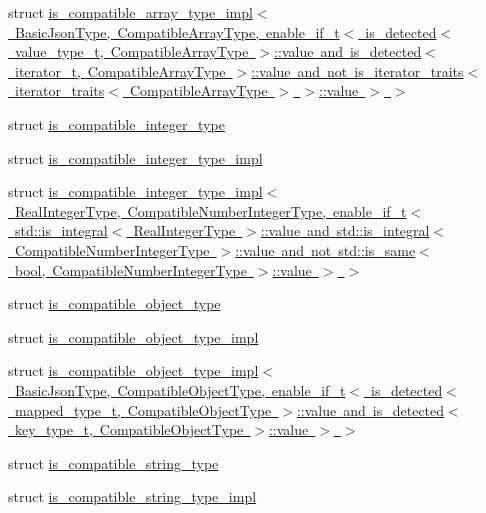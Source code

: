 \begin{DoxyCompactItemize}
struct \mbox{\hyperlink{structnlohmann_1_1detail_1_1is__compatible__array__type__impl_3_01_basic_json_type_00_01_compati04c4671a9fa75002365be1949a74f972}{is\+\_\+compatible\+\_\+array\+\_\+type\+\_\+impl$<$ Basic\+Json\+Type, Compatible\+Array\+Type, enable\+\_\+if\+\_\+t$<$ is\+\_\+detected$<$ value\+\_\+type\+\_\+t, Compatible\+Array\+Type $>$\+::value and is\+\_\+detected$<$ iterator\+\_\+t, Compatible\+Array\+Type $>$\+::value and not is\+\_\+iterator\+\_\+traits$<$ iterator\+\_\+traits$<$ Compatible\+Array\+Type $>$ $>$\+::value $>$ $>$}}
\item 
struct \mbox{\hyperlink{structnlohmann_1_1detail_1_1is__compatible__integer__type}{is\+\_\+compatible\+\_\+integer\+\_\+type}}
\item 
struct \mbox{\hyperlink{structnlohmann_1_1detail_1_1is__compatible__integer__type__impl}{is\+\_\+compatible\+\_\+integer\+\_\+type\+\_\+impl}}
\item 
struct \mbox{\hyperlink{structnlohmann_1_1detail_1_1is__compatible__integer__type__impl_3_01_real_integer_type_00_01_com5aa74bcf254245a639da00509f4d2655}{is\+\_\+compatible\+\_\+integer\+\_\+type\+\_\+impl$<$ Real\+Integer\+Type, Compatible\+Number\+Integer\+Type, enable\+\_\+if\+\_\+t$<$ std\+::is\+\_\+integral$<$ Real\+Integer\+Type $>$\+::value and std\+::is\+\_\+integral$<$ Compatible\+Number\+Integer\+Type $>$\+::value and not std\+::is\+\_\+same$<$ bool, Compatible\+Number\+Integer\+Type $>$\+::value $>$ $>$}}
\item 
struct \mbox{\hyperlink{structnlohmann_1_1detail_1_1is__compatible__object__type}{is\+\_\+compatible\+\_\+object\+\_\+type}}
\item 
struct \mbox{\hyperlink{structnlohmann_1_1detail_1_1is__compatible__object__type__impl}{is\+\_\+compatible\+\_\+object\+\_\+type\+\_\+impl}}
\item 
struct \mbox{\hyperlink{structnlohmann_1_1detail_1_1is__compatible__object__type__impl_3_01_basic_json_type_00_01_compatfbe9a153c4ecce445c98bbdd2d65f605}{is\+\_\+compatible\+\_\+object\+\_\+type\+\_\+impl$<$ Basic\+Json\+Type, Compatible\+Object\+Type, enable\+\_\+if\+\_\+t$<$ is\+\_\+detected$<$ mapped\+\_\+type\+\_\+t, Compatible\+Object\+Type $>$\+::value and is\+\_\+detected$<$ key\+\_\+type\+\_\+t, Compatible\+Object\+Type $>$\+::value $>$ $>$}}
\item 
struct \mbox{\hyperlink{structnlohmann_1_1detail_1_1is__compatible__string__type}{is\+\_\+compatible\+\_\+string\+\_\+type}}
\item 
struct \mbox{\hyperlink{structnlohmann_1_1detail_1_1is__compatible__string__type__impl}{is\+\_\+compatible\+\_\+string\+\_\+type\+\_\+impl}}

\end{DoxyCompactItemize}
